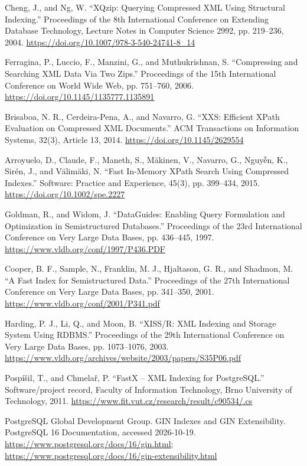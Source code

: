 \begin{enumerate}[label={[\arabic*]},leftmargin=2em,itemsep=0.4em]
\item Cheng, J., and Ng, W. “XQzip: Querying Compressed XML Using Structural Indexing.” Proceedings of the 8th International Conference on Extending Database Technology, Lecture Notes in Computer Science 2992, pp. 219--236, 2004. \url{https://doi.org/10.1007/978-3-540-24741-8_14}
\item Ferragina, P., Luccio, F., Manzini, G., and Muthukrishnan, S. “Compressing and Searching XML Data Via Two Zips.” Proceedings of the 15th International Conference on World Wide Web, pp. 751--760, 2006. \url{https://doi.org/10.1145/1135777.1135891}
\item Brisaboa, N. R., Cerdeira-Pena, A., and Navarro, G. “XXS: Efficient XPath Evaluation on Compressed XML Documents.” ACM Transactions on Information Systems, 32(3), Article 13, 2014. \url{https://doi.org/10.1145/2629554}
\item Arroyuelo, D., Claude, F., Maneth, S., Mäkinen, V., Navarro, G., Nguyễn, K., Sirén, J., and Välimäki, N. “Fast In-Memory XPath Search Using Compressed Indexes.” Software: Practice and Experience, 45(3), pp. 399--434, 2015. \url{https://doi.org/10.1002/spe.2227}
\item Goldman, R., and Widom, J. “DataGuides: Enabling Query Formulation and Optimization in Semistructured Databases.” Proceedings of the 23rd International Conference on Very Large Data Bases, pp. 436--445, 1997. \url{https://www.vldb.org/conf/1997/P436.PDF}
\item Cooper, B. F., Sample, N., Franklin, M. J., Hjaltason, G. R., and Shadmon, M. “A Fast Index for Semistructured Data.” Proceedings of the 27th International Conference on Very Large Data Bases, pp. 341--350, 2001. \url{https://www.vldb.org/conf/2001/P341.pdf}
\item Harding, P. J., Li, Q., and Moon, B. “XISS/R: XML Indexing and Storage System Using RDBMS.” Proceedings of the 29th International Conference on Very Large Data Bases, pp. 1073--1076, 2003. \url{https://www.vldb.org/archives/website/2003/papers/S35P06.pdf}
\item Pospíšil, T., and Chmelař, P. “FastX -- XML Indexing for PostgreSQL.” Software/project record, Faculty of Information Technology, Brno University of Technology, 2011. \url{https://www.fit.vut.cz/research/result/c90534/.cs}
\item PostgreSQL Global Development Group. GIN Indexes and GIN Extensibility. PostgreSQL 16 Documentation, accessed 2026-10-19. \url{https://www.postgresql.org/docs/16/gin.html}; \url{https://www.postgresql.org/docs/16/gin-extensibility.html}

\end{enumerate}
